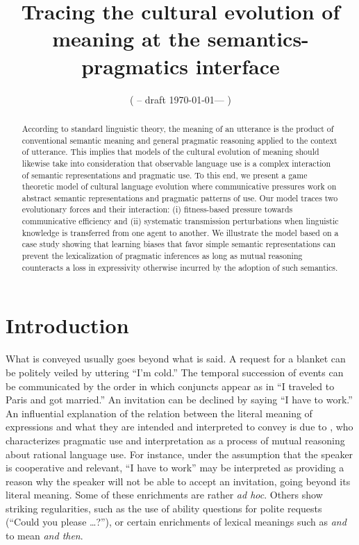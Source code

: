 \documentclass[a4paper]{article}
\title{Tracing the cultural evolution of meaning at the semantics-pragmatics interface}
\author{%
    ( -- draft \today --- )
}
\date{}
\begin{document}
\maketitle

\begin{abstract}
  According to standard linguistic theory, the meaning of an utterance is the product of 
  conventional semantic meaning and general pragmatic reasoning applied
  to the context of utterance. This implies that models of the cultural evolution of meaning
  should likewise take into consideration that observable language use is a complex interaction
  of semantic representations and pragmatic use. To this end, we present a game theoretic model
  of cultural language evolution where communicative pressures work on abstract semantic
  representations and pragmatic patterns of use. Our model traces two evolutionary forces and
  their interaction: (i) fitness-based pressure towards communicative efficiency and (ii)
  systematic transmission perturbations when linguistic knowledge is transferred from one agent
  to another.  We illustrate the model based on a case study showing that learning biases that favor simple semantic
  representations can prevent the lexicalization of pragmatic inferences as long as mutual reasoning counteracts a loss in expressivity otherwise incurred by the adoption of such semantics. 
\end{abstract}

\section{Introduction}\label{sec:introduction}
What is conveyed usually goes beyond what is said. A request for a blanket can be politely
veiled by uttering ``I'm cold.'' The temporal succession of events can be communicated by the
order in which conjuncts appear as in ``I traveled to Paris and got married.'' An invitation
can be declined by saying ``I have to work.'' An influential explanation of the relation
between the literal meaning of expressions and what they are intended and interpreted to convey
is due to \citet{grice:1975}, who characterizes pragmatic use and interpretation as a process of
mutual reasoning about rational language use. For instance, under the assumption that the
speaker is cooperative and relevant, ``I have to work'' may be interpreted as providing a
reason why the speaker will not be able to accept an invitation, going beyond its literal
meaning. Some of these enrichments are rather \emph{ad hoc}. Others show striking regularities,
such as the use of ability questions for polite requests (``Could you please \dots?''), or
certain enrichments of lexical meanings such as \emph{and} to mean \emph{and then}.
\end{document}

